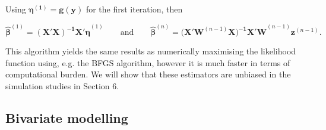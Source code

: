 \documentclass[useAMS,referee]{biom}
\begin{document}
Using $\boldsymbol{\eta^{(1)}} = \mathbf{g}(\mathbf{y})$ for the first iteration, then



\begin{equation}\label{estimatorregression}
\hat{\boldsymbol{\beta}}^{(1)}= \mathbf{(X'X)^{-1} X'\boldsymbol{\eta}}^{(1)}\qquad \mbox{and} \qquad \hat{\boldsymbol{\beta}}^{(n)} = \mathbf{(X'W}^{(n-1)}\mathbf{X)^{-1} X'W}^{(n-1)}\textbf{z}^{(n-1)}.
\end{equation}

This algorithm yields the same results as numerically maximising the likelihood function using, e.g. the BFGS algorithm, however it is much faster in terms of computational burden. We will show that these estimators are unbiased in the simulation studies in Section 6.







\subsection{Bivariate modelling}
\end{document}
